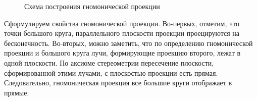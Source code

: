 \begin{wrapfigure}[9]{к}{0.4\tw}
    \centering
    \vspace{-0.8pc}
    \caption{Схема построения гномонической проекции}
    \label{pic:gnomonic-projection-schema} 
\end{wrapfigure}
Сформулируем свойства гномонической проекции. Во-первых, отметим, что точки большого круга, параллельного плоскости проекции проецируются на бесконечность. Во-вторых, можно заметить, что по определению гномонической проекции и большого круга лучи, формирующие проекцию второго, лежат в одной плоскости. По аксиоме стереометрии пересечение плоскости, сформированной этими лучами, с плоскостью проекции есть прямая. Следовательно, гномоническая проекция все большие круги отображает в прямые.

